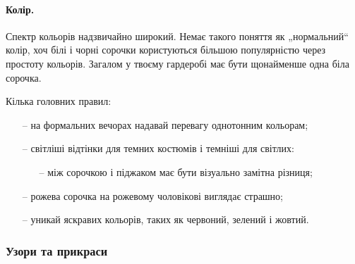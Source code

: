 \paragraph{Колір.} Спектр кольорів надзвичайно широкий. Немає такого поняття як
„нормальний“ колір, хоч білі і чорні сорочки користуються більшою популярністю
через простоту кольорів. Загалом у твоєму гардеробі має бути щонайменше одна
біла сорочка.

Кілька головних правил:
\begin{itemize}
	\item[--] на формальних вечорах надавай перевагу однотонним кольорам;
	\item[--] світліші відтінки для темних костюмів і темніші для світлих:
	\begin{itemize}
		\item[--] між сорочкою і піджаком має бути візуально замітна різниця;
	\end{itemize}
	\item[--] рожева сорочка на рожевому чоловікові виглядає страшно;
	\item[--] уникай яскравих кольорів, таких як червоний, зелений і жовтий.
\end{itemize}

\subsubsection{Узори та прикраси}